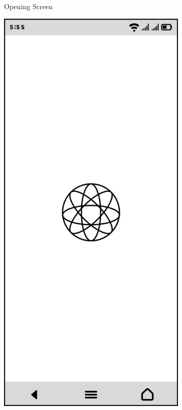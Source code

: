 \documentclass[12pt]{article}
\begin{document}
\begin{figure}[h!]
\begin{subfigure}[b]{0.32\textwidth}
        \caption{Opening Screen}
    \end{subfigure}
    \hfill
    \begin{subfigure}[b]{0.32\textwidth}
        \centering
        \includegraphics[width=\textwidth]{first_page_listening.png}

\end{subfigure}
\end{figure}
\end{document}
